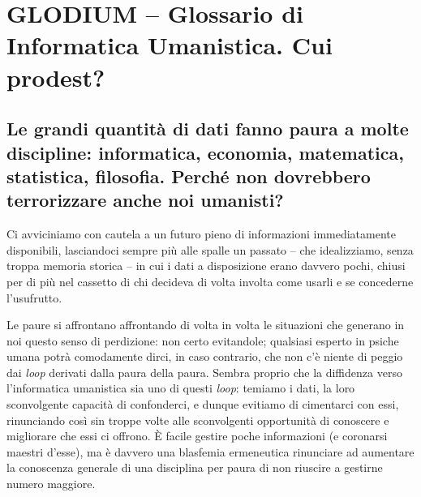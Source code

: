 \documentclass[
  b5paper,
  twoside,
  12pt,
  chapterprefix=false,
  bibliography=totocnumbered,
  parskip=false]{scrbook}
\begin{document}
{
\setcounter{tocdepth}{0}
\tableofcontents
}

\mainmatter
\hypertarget{glodium-glossario-di-informatica-umanistica.-cui-prodest}{%
\chapter*{GLODIUM -- Glossario di Informatica Umanistica. Cui prodest?}\label{glodium-glossario-di-informatica-umanistica.-cui-prodest}}


\hypertarget{le-grandi-quantita-di-dati-fanno-paura-a-molte-discipline-informatica-economia-matematica-statistica-filosofia.-perche-non-dovrebbero-terrorizzare-anche-noi-umanisti}{%
\section*{Le grandi quantità di dati fanno paura a molte discipline: informatica, economia, matematica, statistica, filosofia. Perché non dovrebbero terrorizzare anche noi umanisti?}\label{le-grandi-quantita-di-dati-fanno-paura-a-molte-discipline-informatica-economia-matematica-statistica-filosofia.-perche-non-dovrebbero-terrorizzare-anche-noi-umanisti}}

Ci avviciniamo con cautela a un futuro pieno di informazioni
immediatamente disponibili, lasciandoci sempre più alle spalle un
passato -- che idealizziamo, senza troppa memoria storica -- in cui i
dati a disposizione erano davvero pochi, chiusi per di più nel cassetto
di chi decideva di volta involta come usarli e se concederne
l'usufrutto.

Le paure si affrontano affrontando di volta in volta le situazioni che
generano in noi questo senso di perdizione: non certo evitandole;
qualsiasi esperto in psiche umana potrà comodamente dirci, in caso
contrario, che non c'è niente di peggio dai \emph{loop} derivati dalla paura
della paura. Sembra proprio che la diffidenza verso l'informatica
umanistica sia uno di questi \emph{loop}: temiamo i dati, la loro
sconvolgente capacità di confonderci, e dunque evitiamo di cimentarci
con essi, rinunciando così sin troppe volte alle sconvolgenti
opportunità di conoscere e migliorare che essi ci offrono. È facile
gestire poche informazioni (e coronarsi maestri d'esse), ma è davvero
una blasfemia ermeneutica rinunciare ad aumentare la conoscenza generale
di una disciplina per paura di non riuscire a gestirne numero maggiore.
\end{document}

